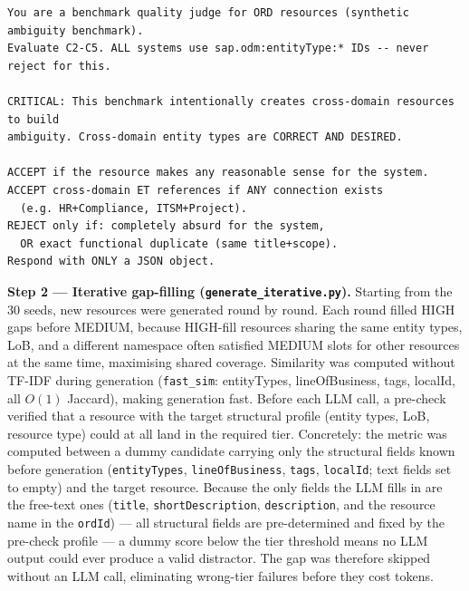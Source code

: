 \begin{lstlisting}[float=!t, floatplacement=!t, basicstyle=\ttfamily\scriptsize, breaklines=true, frame=single, label={lst:judge-seed-prompt}, caption={Judge system prompt from \texttt{generate\_iterative.py} (iterative phase). The seed phase (\texttt{generate\_seeds.py}) uses the same C2--C5 criteria with slightly different phrasing; the instruction to accept cross-domain entity types is present in both.}]
You are a benchmark quality judge for ORD resources (synthetic ambiguity benchmark).
Evaluate C2-C5. ALL systems use sap.odm:entityType:* IDs -- never reject for this.

CRITICAL: This benchmark intentionally creates cross-domain resources to build
ambiguity. Cross-domain entity types are CORRECT AND DESIRED.

ACCEPT if the resource makes any reasonable sense for the system.
ACCEPT cross-domain ET references if ANY connection exists
  (e.g. HR+Compliance, ITSM+Project).
REJECT only if: completely absurd for the system,
  OR exact functional duplicate (same title+scope).
Respond with ONLY a JSON object.
\end{lstlisting}

\medskip\noindent\textbf{Step 2 --- Iterative gap-filling (\texttt{generate\_iterative.py}).} Starting from the 30 seeds, new resources were generated round by round. Each round filled HIGH gaps before MEDIUM, because HIGH-fill resources sharing the same entity types, LoB, and a different namespace often satisfied MEDIUM slots for other resources at the same time, maximising shared coverage. Similarity was computed without TF-IDF during generation (\texttt{fast\_sim}: entityTypes, lineOfBusiness, tags, localId, all $O(1)$ Jaccard), making generation fast. Before each LLM call, a pre-check verified that a resource with the target structural profile (entity types, LoB, resource type) could at all land in the required tier. Concretely: the metric was computed between a dummy candidate carrying only the structural fields known before generation (\texttt{entityTypes}, \texttt{lineOfBusiness}, \texttt{tags}, \texttt{localId}; text fields set to empty) and the target resource. Because the only fields the LLM fills in are the free-text ones (\texttt{title}, \texttt{shortDescription}, \texttt{description}, and the resource name in the \texttt{ordId}) — all structural fields are pre-determined and fixed by the pre-check profile — a dummy score below the tier threshold means no LLM output could ever produce a valid distractor. The gap was therefore skipped without an LLM call, eliminating wrong-tier failures before they cost tokens.

